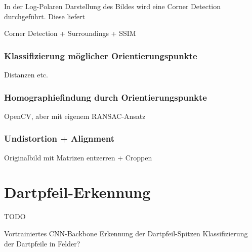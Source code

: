 In der Log-Polaren Darstellung des Bildes wird eine Corner Detection durchgeführt. Diese liefert

Corner Detection + Surroundings + SSIM

\subsubsection{Klassifizierung möglicher Orientierungspunkte}
\label{sec:impl:cv:orient:sorting}
Distanzen etc.

\subsubsection{Homographiefindung durch Orientierungspunkte}
\label{sec:impl:cv:orient:homography}
OpenCV, aber mit eigenem RANSAC-Ansatz

\subsubsection{Undistortion + Alignment}
\label{sec:impl:cv:orient:undistort}
Originalbild mit Matrizen entzerren + Croppen


\section{Dartpfeil-Erkennung}
\label{sec:impl:ki}

TODO

Vortrainiertes CNN-Backbone
Erkennung der Dartpfeil-Spitzen
Klassifizierung der Dartpfeile in Felder?
